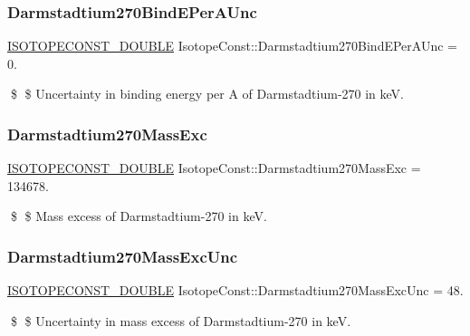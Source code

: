 \subsubsection{\texorpdfstring{Darmstadtium270\+Bind\+E\+Per\+A\+Unc}{Darmstadtium270BindEPerAUnc}}
{\footnotesize\ttfamily \mbox{\hyperlink{group___isotope_const-_macros_ga8f45a7272ce02c0b4c65c44636ed719a}{I\+S\+O\+T\+O\+P\+E\+C\+O\+N\+S\+T\+\_\+\+D\+O\+U\+B\+LE}} Isotope\+Const\+::\+Darmstadtium270\+Bind\+E\+Per\+A\+Unc = 0.}

\$ \$ Uncertainty in binding energy per A of Darmstadtium-\/270 in keV. \mbox{\label{group___isotope_const-_darmstadtium-_ds270_ga69c8e19290d2d5818412adf63393b531}} 
\subsubsection{\texorpdfstring{Darmstadtium270\+Mass\+Exc}{Darmstadtium270MassExc}}
{\footnotesize\ttfamily \mbox{\hyperlink{group___isotope_const-_macros_ga8f45a7272ce02c0b4c65c44636ed719a}{I\+S\+O\+T\+O\+P\+E\+C\+O\+N\+S\+T\+\_\+\+D\+O\+U\+B\+LE}} Isotope\+Const\+::\+Darmstadtium270\+Mass\+Exc = 134678.}

\$ \$ Mass excess of Darmstadtium-\/270 in keV. \mbox{\label{group___isotope_const-_darmstadtium-_ds270_gaa58c0b0fea5522f1e561f9f21b9782e2}} 
\subsubsection{\texorpdfstring{Darmstadtium270\+Mass\+Exc\+Unc}{Darmstadtium270MassExcUnc}}
{\footnotesize\ttfamily \mbox{\hyperlink{group___isotope_const-_macros_ga8f45a7272ce02c0b4c65c44636ed719a}{I\+S\+O\+T\+O\+P\+E\+C\+O\+N\+S\+T\+\_\+\+D\+O\+U\+B\+LE}} Isotope\+Const\+::\+Darmstadtium270\+Mass\+Exc\+Unc = 48.}

\$ \$ Uncertainty in mass excess of Darmstadtium-\/270 in keV. \mbox{\label{group___isotope_const-_darmstadtium-_ds270_ga4175ebf0ad5c97b9eb9c9d5c87de3200}} 
